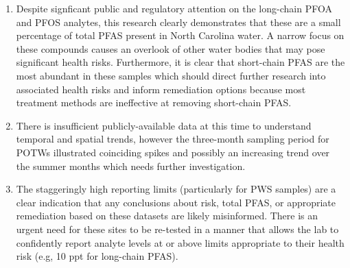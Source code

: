 \documentclass[
  12pt,
]{article}
\begin{document}
\begin{enumerate}
\def\labelenumi{\arabic{enumi}.}
\setcounter{enumi}{1}
\item
  Despite signficant public and regulatory attention on the long-chain
  PFOA and PFOS analytes, this research clearly demonstrates that these
  are a small percentage of total PFAS present in North Carolina water.
  A narrow focus on these compounds causes an overlook of other water
  bodies that may pose significant health risks. Furthermore, it is
  clear that short-chain PFAS are the most abundant in these samples
  which should direct further research into associated health risks and
  inform remediation options because most treatment methods are
  ineffective at removing short-chain PFAS.
\item
  There is insufficient publicly-available data at this time to
  understand temporal and spatial trends, however the three-month
  sampling period for POTWs illustrated coinciding spikes and possibly
  an increasing trend over the summer months which needs further
  investigation.
\item
  The staggeringly high reporting limits (particularly for PWS samples)
  are a clear indication that any conclusions about risk, total PFAS, or
  appropriate remediation based on these datasets are likely
  misinformed. There is an urgent need for these sites to be re-tested
  in a manner that allows the lab to confidently report analyte levels
  at or above limits appropriate to their health risk (e.g, 10 ppt for
  long-chain PFAS).
\end{enumerate}
\end{document}
